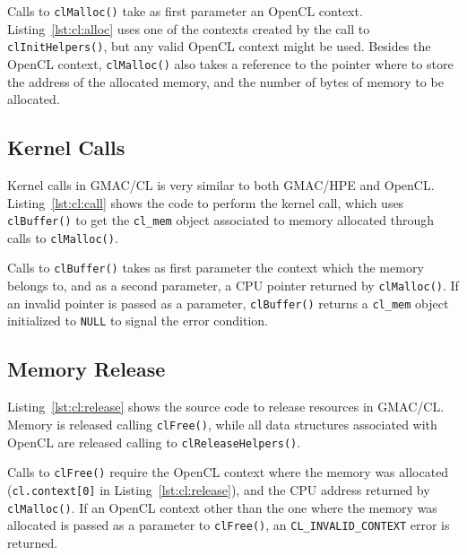 

Calls to \texttt{clMalloc()} take as first parameter an OpenCL context.  Listing~\ref{lst:cl:alloc} 
uses one of the contexts created by the call to \texttt{clInitHelpers()}, but any valid OpenCL 
context might be used. Besides the OpenCL context, \texttt{clMalloc()} also takes a reference to the 
pointer where to store the address of the allocated memory, and the number of bytes of memory to be 
allocated.

\subsection{Kernel Calls}
Kernel calls in GMAC\slash CL is very similar to both GMAC\slash HPE and OpenCL\@.  
Listing~\ref{lst:cl:call} shows the code to perform the kernel call, which uses 
\texttt{clBuffer()} to get the \texttt{cl\_mem} object associated to memory allocated through calls 
to \texttt{clMalloc()}.



Calls to \texttt{clBuffer()} takes as first parameter the context which the memory belongs to, and 
as a second parameter, a CPU pointer returned by \texttt{clMalloc()}.  If an invalid pointer is 
passed as a parameter, \texttt{clBuffer()} returns a \texttt{cl\_mem} object initialized to 
\texttt{NULL} to signal the error condition.

\subsection{Memory Release}
Listing~\ref{lst:cl:release} shows the source code to release resources in GMAC\slash CL. Memory 
is released calling \texttt{clFree()}, while all data structures associated with OpenCL are released 
calling to \texttt{clReleaseHelpers()}.



Calls to \texttt{clFree()} require the OpenCL context where the memory was allocated 
(\texttt{cl.context[0]} in Listing~\ref{lst:cl:release}), and the CPU address returned by 
\texttt{clMalloc()}. If an OpenCL context other than the one where the memory was allocated is 
passed as a parameter to \texttt{clFree()}, an \texttt{CL\_INVALID\_CONTEXT} error is returned.

